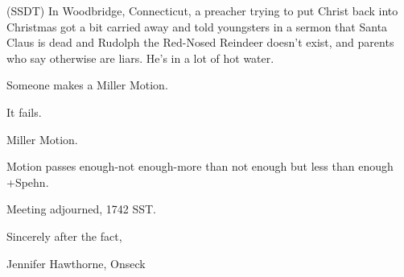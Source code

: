 \documentclass[12pt]{article}
\begin{document}
(SSDT) In Woodbridge, Connecticut, a preacher trying to put Christ back into Christmas got a bit carried away and told youngsters in a sermon that Santa Claus is dead and Rudolph the Red-Nosed Reindeer doesn't exist, and parents who say otherwise are liars. He's in a lot of hot water.

Someone makes a Miller Motion.

It fails.

Miller Motion.

Motion passes enough-not enough-more than not enough but less than enough +Spehn.

\vspace{12pt}

\noindent
Meeting adjourned, 1742 SST.

\vspace{18pt}

\centerline{Sincerely after the fact,}
\centerline{Jennifer Hawthorne, Onseck}
\end{document}
